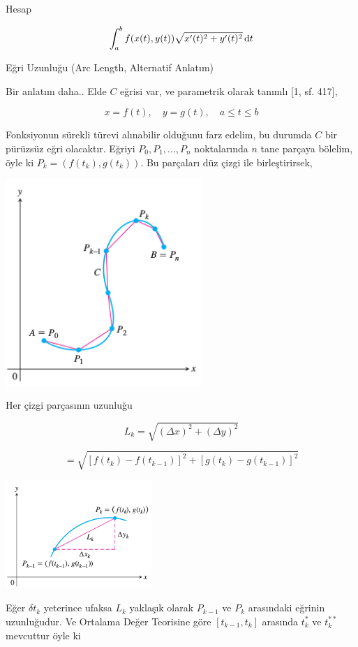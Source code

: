 \documentclass[12pt,fleqn]{article}\usepackage{../../common}
\begin{document}
Hesap

$$
\int_{a}^{b} f(x(t),y(t)) \sqrt {x'(t)^2 + y'(t)^2} \,\mathrm{d} t
$$


Eğri Uzunluğu (Arc Length, Alternatif Anlatım)

Bir anlatım daha.. Elde $C$ eğrisi var, ve parametrik olarak tanımlı [1, sf. 417],

$$
x = f(t), \quad y = g(t), \quad a \le t \le b
$$

Fonksiyonun sürekli türevi alınabilir olduğunu farz edelim, bu durumda $C$ bir
pürüzsüz eğri olacaktır.  Eğriyi $P_0,P_1,...,P_n$ noktalarında $n$ tane parçaya
bölelim, öyle ki $P_k = (f(t_k),g(t_k))$. Bu parçaları düz çizgi ile
birleştirirsek,

\includegraphics[width=20em]{calc_multi_06_01.png}

Her çizgi parçasının uzunluğu 

$$
L_k = \sqrt{(\Delta x)^2 + (\Delta y)^2}
$$

$$
= \sqrt{[f(t_k) - f(t_{k-1})]^2 + [g(t_k) - g(t_{k-1})]^2 }
$$

\includegraphics[width=15em]{calc_multi_06_03.png}

Eğer $\delta t_k$ yeterince ufaksa $L_k$ yaklaşık olarak $P_{k-1}$ ve $P_k$
arasındaki eğrinin uzunluğudur. Ve Ortalama Değer Teorisine göre
$[t_{k-1},t_k]$ arasında $t_k^\ast$ ve $t_k^{**}$ mevcuttur öyle ki 
\end{document}

